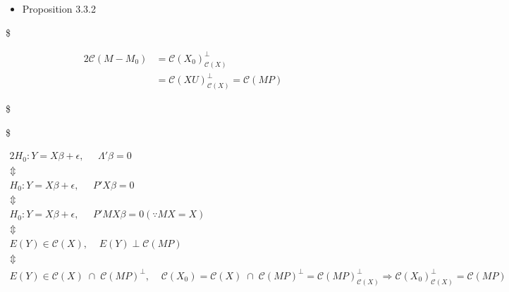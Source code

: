 \documentclass[
]{book}
\providecommand{\tightlist}{%
  \setlength{\itemsep}{0pt}\setlength{\parskip}{0pt}}
\begin{document}
{{{\begin{itemize}
\tightlist
\item
  Proposition 3.3.2
\end{itemize}

\$

\begin{alignat}{2}

\mathcal{C}(M-M_0) 


&= \mathcal{C}(X_0)_{\mathcal{C}(X)}^\perp \\

&= \mathcal{C}(XU)_{\mathcal{C}(X)}^\perp


= \mathcal{C}(MP) 

\end{alignat}

\$

\$

\begin{alignat}{2}

H_0: Y=X\beta + \epsilon, \; \; \; \; \; \Lambda ' \beta = 0

\\

\Updownarrow

\\

H_0: Y=X\beta + \epsilon, \; \; \; \; \; P'X \beta = 0

\\

\Updownarrow

\\


H_0: Y=X\beta + \epsilon, \; \; \; \; \; P'MX \beta = 0 (\because MX = X)

\\

\Updownarrow

\\

E(Y) \in \mathcal{C}(X), \; \; \; \; E(Y) \perp \mathcal{C}(MP)

\\

\Updownarrow

\\

E(Y) \in \mathcal{C}(X) \; \cap \;  \mathcal{C}(MP)^\perp, \; \; \; \; 
\mathcal{C}(X_0)=\mathcal{C}(X) \; \cap \; \mathcal{C}(MP)^\perp = \mathcal{C}(MP)^\perp_{\mathcal{C}(X)}

\Longrightarrow

\mathcal{C}(X_0)^\perp_{\mathcal{C}(X)} = \mathcal{C}(MP)






\end{alignat}}}}
\end{document}
